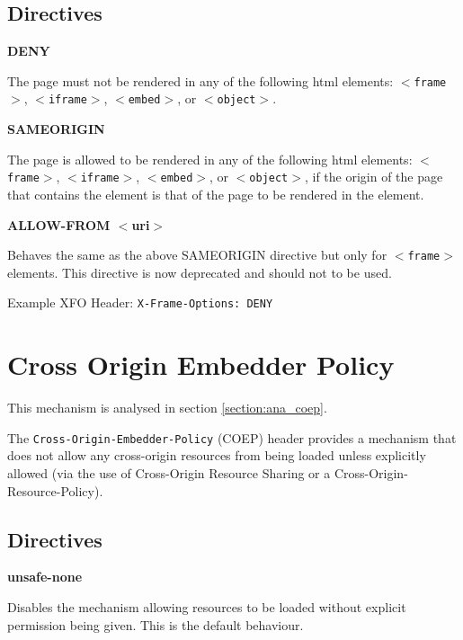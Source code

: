 \documentclass{mscreport}
\begin{document}
\subsection{Directives}

\textbf{DENY}

\vspace{0.3cm} \noindent
The page must not be rendered in any of the following html elements: \texttt{$<$frame$>$}, \texttt{$<$iframe$>$}, \texttt{$<$embed$>$}, or \texttt{$<$object$>$}.

\vspace{0.7cm} \noindent
\textbf{SAMEORIGIN}

\vspace{0.3cm} \noindent
The page is allowed to be rendered in any of the following html elements: \texttt{$<$frame$>$}, \texttt{$<$iframe$>$}, \texttt{$<$embed$>$}, or \texttt{$<$object$>$}, if the origin of the page that contains the element is that of the page to be rendered in the element.

\vspace{0.7cm} \noindent
\textbf{ALLOW-FROM $<$uri$>$}

\vspace{0.3cm} \noindent
Behaves the same as the above SAMEORIGIN directive but only for \texttt{$<$frame$>$} elements. This directive is now deprecated and should not to be used.

\vspace{0.3cm} \noindent
Example XFO Header: \texttt{X-Frame-Options: DENY}

\section{Cross Origin Embedder Policy}
\label{section:bg_coep}

This mechanism is analysed in section \ref{section:ana_coep}.

\vspace{0.3cm} \noindent
The \texttt{Cross-Origin-Embedder-Policy} (COEP) header provides a mechanism that does not allow any cross-origin resources from being loaded unless explicitly allowed (via the use of Cross-Origin Resource Sharing or a Cross-Origin-Resource-Policy).

\subsection{Directives}
\textbf{unsafe-none}

\vspace{0.3cm} \noindent
Disables the mechanism allowing resources to be loaded without explicit permission being given. This is the default behaviour.
\end{document}
